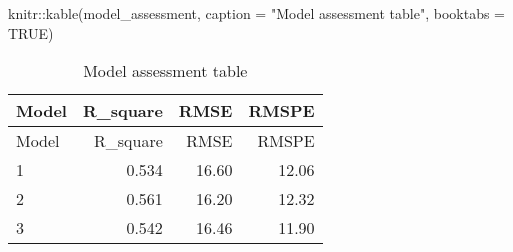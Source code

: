 \documentclass[
  11pt,
]{article}
\newenvironment{Shaded}{\begin{snugshade}}{\end{snugshade}}
\newcommand{\AttributeTok}[1]{\textcolor[rgb]{0.77,0.63,0.00}{#1}}
\newcommand{\ConstantTok}[1]{\textcolor[rgb]{0.00,0.00,0.00}{#1}}
\newcommand{\FunctionTok}[1]{\textcolor[rgb]{0.00,0.00,0.00}{#1}}
\newcommand{\NormalTok}[1]{#1}
\newcommand{\SpecialCharTok}[1]{\textcolor[rgb]{0.00,0.00,0.00}{#1}}
\newcommand{\StringTok}[1]{\textcolor[rgb]{0.31,0.60,0.02}{#1}}
\begin{document}
\begin{Shaded}
\begin{Highlighting}[]
\NormalTok{knitr}\SpecialCharTok{::}\FunctionTok{kable}\NormalTok{(model\_assessment, }\AttributeTok{caption =} \StringTok{"Model assessment table"}\NormalTok{, }\AttributeTok{booktabs =} \ConstantTok{TRUE}\NormalTok{)}
\end{Highlighting}
\end{Shaded}

\begin{longtable}[]{@{}lrrr@{}}
\caption{Model assessment table}\tabularnewline
\toprule
Model & R\_square & RMSE & RMSPE \\
\midrule
\endfirsthead
\toprule
Model & R\_square & RMSE & RMSPE \\
\midrule
\endhead
1 & 0.534 & 16.60 & 12.06 \\
2 & 0.561 & 16.20 & 12.32 \\
3 & 0.542 & 16.46 & 11.90 \\
\bottomrule
\end{longtable}
\end{document}
